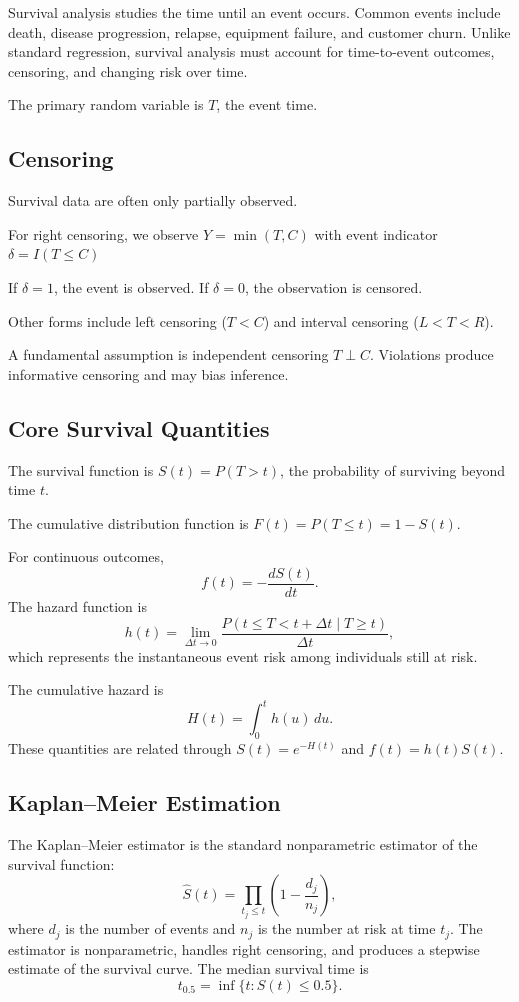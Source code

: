 \documentclass[11pt]{article}
\begin{document}
Survival analysis studies the time until an event occurs. Common events include death, disease progression, relapse, equipment failure, and customer churn.
Unlike standard regression, survival analysis must account for time-to-event outcomes, censoring, and changing risk over time.

The primary random variable is $T$, the event time.

\subsection*{Censoring}

Survival data are often only partially observed.

For right censoring, we observe $Y=\min(T,C)$ with event indicator $\delta=I(T\le C)$

If $\delta=1$, the event is observed. If $\delta=0$, the observation is censored.

Other forms include left censoring ($T<C$) and interval censoring ($L<T<R$).

A fundamental assumption is independent censoring $T\perp C$. Violations produce informative censoring and may bias inference.

\subsection*{Core Survival Quantities}

The survival function is $S(t)=P(T>t)$, the probability of surviving beyond time $t$.

The cumulative distribution function is $F(t)=P(T\le t)=1-S(t)$. 

For continuous outcomes,
\[f(t)=-\frac{dS(t)}{dt}.\]
The hazard function is
\[h(t)=\lim_{\Delta t\to0}\frac{P(t\le T<t+\Delta t\mid T\ge t)}{\Delta t},\]
which represents the instantaneous event risk among individuals still at risk.

The cumulative hazard is
\[H(t)=\int_0^t h(u)\,du.\]
These quantities are related through $S(t)=e^{-H(t)}$ and $f(t)=h(t)S(t)$.

\subsection*{Kaplan--Meier Estimation}

The Kaplan--Meier estimator is the standard nonparametric estimator of the survival function:
\[\hat S(t)=\prod_{t_j\le t}\left(1-\frac{d_j}{n_j}\right),\]
where $d_j$ is the number of events and $n_j$ is the number at risk at time $t_j$.
The estimator is nonparametric, handles right censoring, and produces a stepwise estimate of the survival curve.
The median survival time is
\[t_{0.5}=\inf\{t:S(t)\le0.5\}.\]
\end{document}
